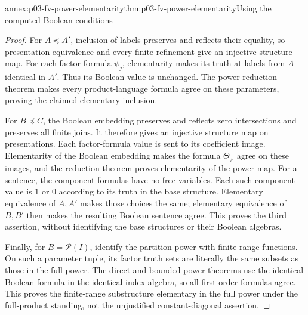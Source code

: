 \begin{annexitem}{annex:p03-fv-power-elementarity}{thm:p03-fv-power-elementarity}{Using the computed Boolean conditions}
\begin{proof}
For \(A\preccurlyeq A'\), inclusion of labels preserves and reflects
their equality, so presentation equivalence and every finite refinement
give an injective structure map. For each factor formula \(\psi_j\),
elementarity makes its truth at labels from \(A\) identical in \(A'\).
Thus its Boolean value is unchanged. The power-reduction theorem makes
every product-language formula agree on these parameters, proving the
claimed elementary inclusion.

For \(B\preccurlyeq C\), the Boolean embedding preserves and reflects
zero intersections and preserves all finite joins. It therefore gives an
injective structure map on presentations. Each factor-formula value is
sent to its coefficient image. Elementarity of the Boolean embedding makes
the formula \(\Theta_\varphi\) agree on these images, and the reduction
theorem proves elementarity of the power map.
For a sentence, the component formulas have no free variables. Each such
component value is \(1\) or \(0\) according to its truth in the base
structure. Elementary equivalence of \(A,A'\) makes those choices the
same; elementary equivalence of \(B,B'\) then makes the resulting
Boolean sentence agree. This proves the third assertion, without identifying
the base structures or their Boolean algebras.

Finally, for \(B=\mathcal P(I)\), identify the partition power with
finite-range functions. On such a parameter tuple, its factor truth sets
are literally the same subsets as those in the full power. The direct and
bounded power theorems use the identical Boolean formula in the identical
index algebra, so all first-order formulas agree. This proves the
finite-range substructure elementary in the full power under the full-product
standing, not the unjustified constant-diagonal assertion.
\end{proof}
\end{annexitem}

